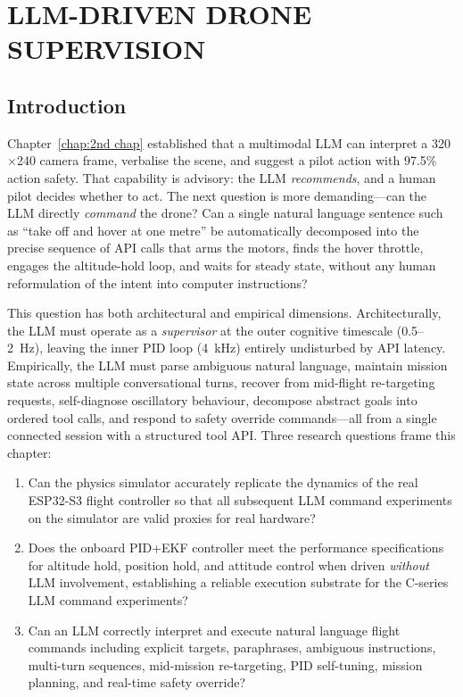 \chapter{LLM-DRIVEN DRONE SUPERVISION}
\label{chap:3rd chap}

\section{Introduction}
\label{sec:ch3_intro}

Chapter~\ref{chap:2nd chap} established that a multimodal LLM can interpret a
320$\times$240 camera frame, verbalise the scene, and suggest a pilot action with
97.5\% action safety. That capability is advisory: the LLM \emph{recommends}, and
a human pilot decides whether to act. The next question is more demanding---can
the LLM directly \emph{command} the drone? Can a single natural language sentence
such as ``take off and hover at one metre'' be automatically decomposed into the
precise sequence of API calls that arms the motors, finds the hover throttle,
engages the altitude-hold loop, and waits for steady state, without any human
reformulation of the intent into computer instructions?

This question has both architectural and empirical dimensions. Architecturally,
the LLM must operate as a \emph{supervisor} at the outer cognitive timescale
(0.5--2~Hz), leaving the inner PID loop (4~kHz) entirely undisturbed by API
latency. Empirically, the LLM must parse ambiguous natural language, maintain
mission state across multiple conversational turns, recover from mid-flight
re-targeting requests, self-diagnose oscillatory behaviour, decompose abstract
goals into ordered tool calls, and respond to safety override commands---all
from a single connected session with a structured tool API. Three research
questions frame this chapter:

\begin{enumerate}
  \item Can the physics simulator accurately replicate the dynamics of the
        real ESP32-S3 flight controller so that all subsequent LLM command
        experiments on the simulator are valid proxies for real hardware?
  \item Does the onboard PID+EKF controller meet the performance specifications
        for altitude hold, position hold, and attitude control when driven
        \emph{without} LLM involvement, establishing a reliable execution substrate
        for the C-series LLM command experiments?
  \item Can an LLM correctly interpret and execute natural language flight
        commands including explicit targets, paraphrases, ambiguous instructions,
        multi-turn sequences, mid-mission re-targeting, PID self-tuning, mission
        planning, and real-time safety override?
\end{enumerate}

